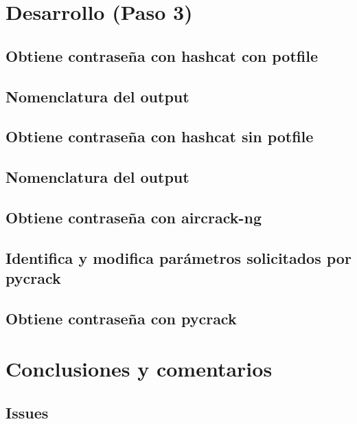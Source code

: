 \documentclass[letter,12pt]{article}
\begin{document}
\section{Desarrollo (Paso 3)}

\subsection{Obtiene contraseña con hashcat con potfile}

\subsection{Nomenclatura del output}

\subsection{Obtiene contraseña con hashcat sin potfile}

\subsection{Nomenclatura del output}

\subsection{Obtiene contraseña con aircrack-ng}

\subsection{Identifica y modifica parámetros solicitados por pycrack}

\subsection{Obtiene contraseña con pycrack}


\section*{Conclusiones y comentarios}

\subsection*{Issues}
\end{document}
